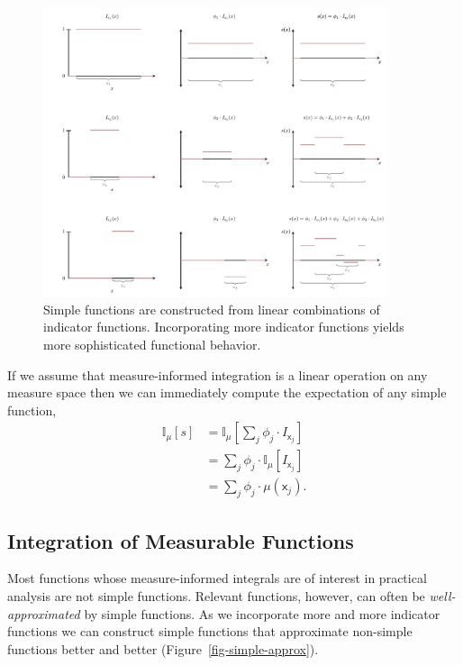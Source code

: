 \documentclass[
  letterpaper,
  DIV=11,
  numbers=noendperiod]{scrartcl}
\begin{document}
\begin{figure}

{\centering \includegraphics[width=0.9\textwidth,height=\textheight]{figures/simple_function/simple_function.pdf}

}

\caption{\label{fig-simple}Simple functions are constructed from linear
combinations of indicator functions. Incorporating more indicator
functions yields more sophisticated functional behavior.}

\end{figure}

If we assume that measure-informed integration is a linear operation on
any measure space then we can immediately compute the expectation of any
simple function, \begin{align*}
\mathbb{I}_{\mu}[ s ]
&=
\mathbb{I}_{\mu} \left[ \sum_{j} \phi_{j} \cdot I_{\mathsf{x}_{j}} \right]
\\
&=
\sum_{j} \phi_{j} \cdot \mathbb{I}_{\mu}[ I_{\mathsf{x}_{j}} ]
\\
&=
\sum_{j} \phi_{j} \cdot \mu(\mathsf{x}_{j}).
\end{align*}

\hypertarget{integration-of-measurable-functions}{%
\subsection{Integration of Measurable
Functions}\label{integration-of-measurable-functions}}

Most functions whose measure-informed integrals are of interest in
practical analysis are not simple functions. Relevant functions,
however, can often be \emph{well-approximated} by simple functions. As
we incorporate more and more indicator functions we can construct simple
functions that approximate non-simple functions better and better
(Figure~\ref{fig-simple-approx}).
\end{document}
